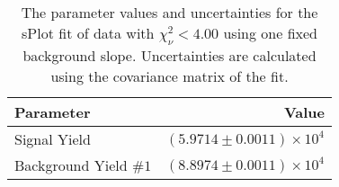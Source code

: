 
\begin{table}[ht]
    \begin{center}
        \begin{tabular}{lr}\toprule
            Parameter & Value \\\midrule
            Signal Yield & $(5.9714 \pm 0.0011) \times 10^{4}$ \\
            Background Yield $\#1$ & $(8.8974 \pm 0.0011) \times 10^{4}$ \\\bottomrule
        \end{tabular}
        \caption{The parameter values and uncertainties for the sPlot fit of data with $\chi^2_\nu < 4.00$ using one fixed background slope. Uncertainties are calculated using the covariance matrix of the fit.}\label{tab:splot-fit-results-chisqdof-4.00-fixed-1}
    \end{center}
\end{table}

